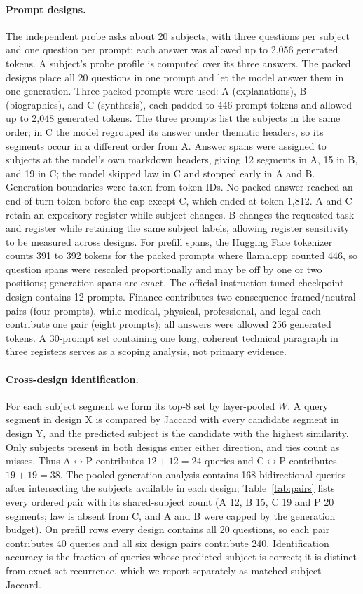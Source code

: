 \documentclass[10pt,twocolumn]{article}
\begin{document}
\paragraph{Prompt designs.} The independent probe asks about 20 subjects, with three questions per subject and one question per prompt; each answer was allowed up to 2,056 generated tokens. A subject's probe profile is computed over its three answers. The packed designs place all 20 questions in one prompt and let the model answer them in one generation. Three packed prompts were used: A (explanations), B (biographies), and C (synthesis), each padded to 446 prompt tokens and allowed up to 2,048 generated tokens. The three prompts list the subjects in the same order; in C the model regrouped its answer under thematic headers, so its segments occur in a different order from A. Answer spans were assigned to subjects at the model's own markdown headers, giving 12 segments in A, 15 in B, and 19 in C; the model skipped law in C and stopped early in A and B. Generation boundaries were taken from token IDs. No packed answer reached an end-of-turn token before the cap except C, which ended at token 1,812. A and C retain an expository register while subject changes. B changes the requested task and register while retaining the same subject labels, allowing register sensitivity to be measured across designs. For prefill spans, the Hugging Face tokenizer counts 391 to 392 tokens for the packed prompts where llama.cpp counted 446, so question spans were rescaled proportionally and may be off by one or two positions; generation spans are exact. The official instruction-tuned checkpoint design contains 12 prompts. Finance contributes two consequence-framed/neutral pairs (four prompts), while medical, physical, professional, and legal each contribute one pair (eight prompts); all answers were allowed 256 generated tokens. A 30-prompt set containing one long, coherent technical paragraph in three registers serves as a scoping analysis, not primary evidence.

\paragraph{Cross-design identification.} For each subject segment we form its top-8 set by layer-pooled $W$. A query segment in design X is compared by Jaccard with every candidate segment in design Y, and the predicted subject is the candidate with the highest similarity. Only subjects present in both designs enter either direction, and ties count as misses. Thus A$\leftrightarrow$P contributes $12 + 12 = 24$ queries and C$\leftrightarrow$P contributes $19 + 19 = 38$. The pooled generation analysis contains 168 bidirectional queries after intersecting the subjects available in each design; Table~\ref{tab:pairs} lists every ordered pair with its shared-subject count (A 12, B 15, C 19 and P 20 segments; law is absent from C, and A and B were capped by the generation budget). On prefill rows every design contains all 20 questions, so each pair contributes 40 queries and all six design pairs contribute 240. Identification accuracy is the fraction of queries whose predicted subject is correct; it is distinct from exact set recurrence, which we report separately as matched-subject Jaccard.
\end{document}
